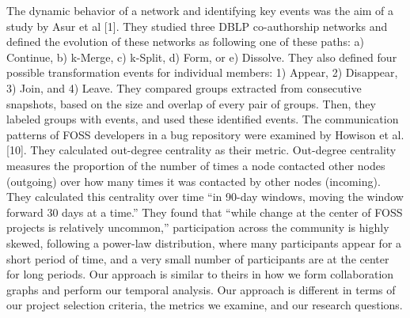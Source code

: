 \documentclass[ifip]{svmult}
\begin{document}
The dynamic behavior of a network and identifying key events was the aim of a study by Asur et al [1]. They studied three DBLP co-authorship networks and defined the evolution of these networks as following one of these paths: a) Continue, b) k-Merge, c) k-Split, d) Form, or e) Dissolve. They also defined four possible transformation events for individual members: 1) Appear, 2) Disappear, 3) Join, and 4) Leave. They compared groups extracted from consecutive snapshots, based on the size and overlap of every pair of groups. Then, they labeled groups with events, and used these identified events.
%
%
The communication patterns of FOSS developers in a bug repository were examined by Howison et al. [10]. They calculated out-degree centrality as their metric. Out-degree centrality measures the proportion of the number of times a node contacted other nodes (outgoing) over how many times it was contacted by other nodes (incoming). They calculated this centrality over time ``in 90-day windows, moving the window forward 30 days at a time.'' They found that ``while change at the center of FOSS projects is relatively uncommon,'' participation across the community is highly skewed, following a power-law distribution, where many participants appear for a short period of time, and a very small number of participants are at the center for long periods. Our approach is similar to theirs in how we form collaboration graphs and perform our temporal analysis. Our approach is different in terms of our project selection criteria, the metrics we examine, and our research questions.
\end{document}
